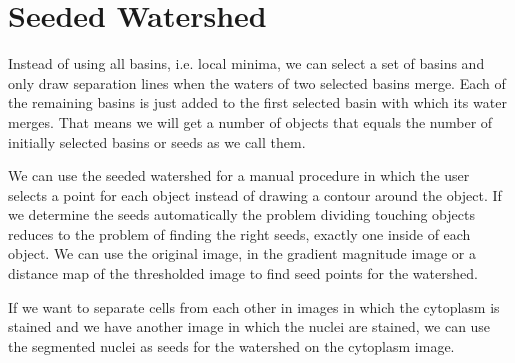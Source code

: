 \chapter{Seeded Watershed}

Instead of using all basins, i.e. local minima, we can select a set of basins and only draw separation lines when the waters of two selected basins merge. Each of the remaining basins is just added to the first selected basin with which its water merges. That means we will get a number of objects that equals the number of initially selected basins or seeds as we call them.

We can use the seeded watershed\cite{meyer_morphological_1990} for a manual procedure in which the user selects a point for each object instead of drawing a contour around the object. If we determine the seeds automatically the problem dividing touching objects reduces to the problem of finding the right seeds, exactly one inside of each object. We can use the original image, in the gradient magnitude image or a distance map of the thresholded image to find seed points for the watershed.

If we want to separate cells from each other in images in which the cytoplasm is stained and we have another image in which the nuclei are stained, we can use the segmented nuclei as seeds for the watershed on the cytoplasm image.

